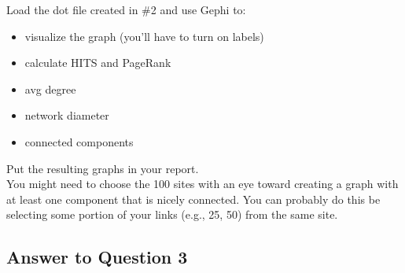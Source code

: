 \documentclass{article}
\begin{document}
Load the dot file created in \#2 and use Gephi to:
\begin{itemize}
\item visualize the graph (you'll have to turn on labels)
\item calculate HITS and PageRank
\item avg degree
\item network diameter
\item connected components
\end{itemize}

Put the resulting graphs in your report. \\

You might need to choose the 100 sites with an eye toward creating a graph with at least one component that is nicely connected. You can probably do this be selecting some portion of your links (e.g., 25, 50) from the same site.

\subsection*{Answer to Question 3}
\end{document}
